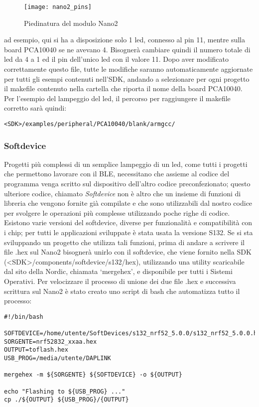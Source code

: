 \begin{figure}[H]
\texttt{[image: nano2\_pins]}
\centering
\caption{Piedinatura del modulo Nano2}
\label{nano2_pins}
\end{figure}
ad esempio, qui si ha a disposizione solo 1 led, connesso al pin 11, mentre sulla board PCA10040 se ne avevano 4. Bisognerà cambiare quindi il numero totale di led da 4 a 1 ed il pin dell'unico led con il valore 11.
Dopo aver modificato correttamente questo file, tutte le modifiche saranno automaticamente aggiornate per tutti gli esempi contenuti nell'SDK, andando a selezionare per ogni progetto il makefile contenuto nella cartella che riporta il nome della board PCA10040.
Per l'esempio del lampeggio del led, il percorso per raggiungere il makefile corretto sarà quindi:

\begin{verbatim}
<SDK>/examples/peripheral/PCA10040/blank/armgcc/
\end{verbatim}

\subsubsection{Softdevice}
Progetti più complessi di un semplice lampeggio di un led, come tutti i progetti che permettono lavorare con il BLE, necessitano che assieme al codice del programma venga scritto sul dispositivo dell'altro codice preconfezionato; questo ulteriore codice, chiamato \emph{Softdevice} non è altro che un insieme di funzioni di libreria che vengono fornite già compilate e che sono utilizzabili dal nostro codice per svolgere le operazioni più complesse utilizzando poche righe di codice. Esistono varie versioni del softdevice, diverse per funzionalità e compatibilità con i chip; per tutti le applicazioni sviluppate è stata usata la versione S132.
Se si sta sviluppando un progetto che utilizza tali funzioni, prima di andare a scrivere il file .hex sul Nano2 bisognerà unirlo con il softdevice, che viene fornito nella SDK (<SDK>/components/softdevice/s132/hex), utilizzando una utility scaricabile dal sito della Nordic, chiamata \lq mergehex\rq, e disponibile per tutti i Sistemi Operativi.
Per velocizzare il processo di unione dei due file .hex e successiva scrittura sul Nano2 è stato creato uno script di bash che automatizza tutto il processo:

\begin{verbatim}
#!/bin/bash

SOFTDEVICE=/home/utente/SoftDevices/s132_nrf52_5.0.0/s132_nrf52_5.0.0.hex
SORGENTE=nrf52832_xxaa.hex 
OUTPUT=toflash.hex
USB_PROG=/media/utente/DAPLINK

mergehex -m ${SORGENTE} ${SOFTDEVICE} -o ${OUTPUT}

echo "Flashing to ${USB_PROG} ..."
cp ./${OUTPUT} ${USB_PROG}/{OUTPUT}
\end{verbatim}

